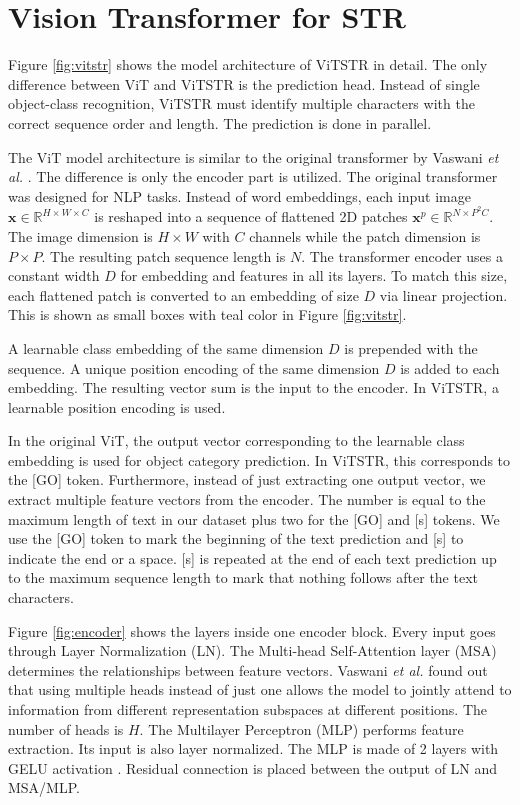 \documentclass[runningheads]{llncs}
\begin{document}
\section{Vision Transformer for STR}

Figure \ref{fig:vitstr} shows the model architecture of ViTSTR in detail. The only difference between ViT and ViTSTR is the prediction head. Instead of single object-class recognition, ViTSTR must identify multiple characters with the correct sequence order and length. The prediction is done in parallel.

The ViT model architecture is similar to the original transformer by Vaswani \textit{et al.} \cite{vaswani2017attention}. The difference is only the encoder part is utilized. The original transformer was designed for NLP tasks. Instead of word embeddings, each input image $\textbf{x}\in{	\mathbb{R}}^{H\times{W}\times{C}}$ is reshaped into a sequence of flattened 2D patches $\textbf{x}^{p}\in{	\mathbb{R}}^{N\times{P^2}{C}}$. The image dimension is $H\times{W}$ with $C$ channels while the patch dimension is $P\times{P}$. The resulting patch sequence length is $N$. The transformer encoder uses a constant width $D$ for embedding and features in all its layers. To match this size, each flattened patch is converted to an embedding of size $D$ via linear projection. This is shown as small boxes with teal color in Figure \ref{fig:vitstr}. 

A learnable class embedding of the same dimension $D$ is prepended with the sequence. A unique position encoding of the same dimension $D$ is added to each embedding. The resulting vector sum is the input to the encoder. In ViTSTR, a learnable position encoding is used.

In the original ViT, the output vector corresponding to the learnable class embedding is used for object category prediction. In ViTSTR, this corresponds to the [GO] token. Furthermore, instead of just extracting one output vector, we extract multiple feature vectors from the encoder. The number is equal to the maximum length of text in our dataset plus two for the [GO] and [s] tokens. We use the [GO] token to mark the beginning of the text prediction and [s] to indicate the end or a space. [s] is repeated at the end of each text prediction up to the maximum sequence length to mark that nothing follows after the text characters.

Figure \ref{fig:encoder} shows the layers inside one encoder block. Every input goes through Layer Normalization (LN). The Multi-head Self-Attention layer (MSA) determines the relationships between feature vectors. Vaswani \textit{et al.} \cite{vaswani2017attention} found out that using multiple heads instead of just one allows the model to jointly attend to information from different representation subspaces at different positions. The number of heads is $H$. The Multilayer Perceptron (MLP) performs feature extraction. Its input is also layer normalized. The MLP is made of 2 layers with GELU activation \cite{hendrycks2016gaussian}. Residual connection is placed between the output of LN and MSA/MLP.
\end{document}
